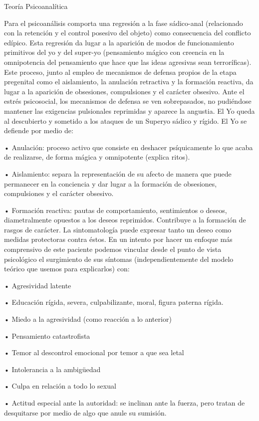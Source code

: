 Teoría Psicoanalítica

Para el psicoanálisis comporta una regresión a la fase sádico-anal (relacionado con la retención y el control posesivo del objeto) como consecuencia del conflicto edípico. Esta regresión da lugar a la aparición de modos de funcionamiento primitivos del yo y del super-yo (pensamiento mágico con creencia en la omnipotencia del pensamiento que hace que las ideas agresivas sean terroríficas). Este proceso, junto al empleo de mecanismos de defensa propios de la etapa pregenital como el aislamiento, la anulación retractiva y la formación reactiva, da lugar a la aparición de obsesiones, compulsiones y el carácter obsesivo. Ante el estrés psicosocial, los mecanismos de defensa se ven sobrepasados, no pudiéndose mantener las exigencias pulsionales reprimidas y aparece la angustia. El Yo queda al descubierto y sometido a los ataques de un Superyo sádico y rígido. El Yo se defiende por medio de:

• Anulación: proceso activo que consiste en deshacer psíquicamente lo que acaba de realizarse, de forma mágica y omnipotente (explica ritos).

• Aislamiento: separa la representación de su afecto de manera que puede permanecer en la conciencia y dar lugar a la formación de obsesiones, compulsiones y el carácter obsesivo.

• Formación reactiva: pautas de comportamiento, sentimientos o deseos, diametralmente opuestos a los deseos reprimidos. Contribuye a la formación de rasgos de carácter. La sintomatología puede expresar tanto un deseo como medidas protectoras contra éstos. En un intento por hacer un enfoque más comprensivo de este paciente podemos vincular desde el punto de vista psicológico el surgimiento de sus síntomas (independientemente del modelo teórico que usemos para explicarlos) con:

• Agresividad latente

• Educación rígida, severa, culpabilizante, moral, figura paterna rígida.

• Miedo a la agresividad (como reacción a lo anterior)

• Pensamiento catastrofista

• Temor al descontrol emocional por temor a que sea letal

• Intolerancia a la ambigüedad

• Culpa en relación a todo lo sexual

• Actitud especial ante la autoridad: se inclinan ante la fuerza, pero tratan de desquitarse por medio de algo que anule su sumisión.

